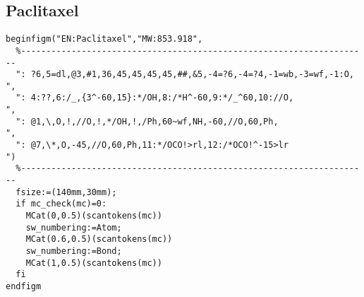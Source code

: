 \documentclass[a4paper]{article}
\begin{document}
\subsection{Paclitaxel}
\noindent%
\begin{verbatim}
beginfigm("EN:Paclitaxel","MW:853.918",
  %---------------------------------------------------------------------
  ": ?6,5=dl,@3,#1,36,45,45,45,45,##,&5,-4=?6,-4=?4,-1=wb,-3=wf,-1:O, ",
  ": 4:??,6:/_,{3^-60,15}:*/OH,8:/*H^-60,9:*/_^60,10://O,             ",
  ": @1,\,O,!,//O,!,*/OH,!,/Ph,60~wf,NH,-60,//O,60,Ph,                ",
  ": @7,\*,O,-45,//O,60,Ph,11:*/OCO!>rl,12:/*OCO!^-15>lr              ")
  %---------------------------------------------------------------------
  fsize:=(140mm,30mm);
  if mc_check(mc)=0:
    MCat(0,0.5)(scantokens(mc))
    sw_numbering:=Atom;
    MCat(0.6,0.5)(scantokens(mc))
    sw_numbering:=Bond;
    MCat(1,0.5)(scantokens(mc))
  fi
endfigm
\end{verbatim}
\newpage
\end{document}
